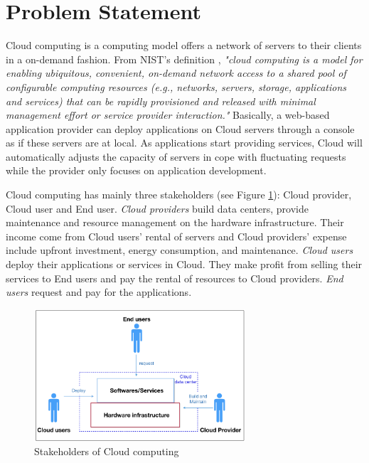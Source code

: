 \section{Problem Statement}

Cloud computing is a computing model offers a network of servers to their 
clients in a on-demand fashion. From NIST's definition \cite{Mell:2011jj}, \textit{"cloud computing is a model for enabling ubiquitous, convenient, on-demand network access to a shared pool of configurable computing resources (e.g., networks, servers, storage, applications and services) that can be rapidly provisioned and released with minimal management effort or service provider interaction."} 
Basically, a web-based application provider can deploy applications on Cloud servers through a console as if these servers are at local. As applications start providing services, Cloud will automatically adjusts the capacity of servers in cope with fluctuating requests while the provider only focuses on application development. 


Cloud computing has mainly three stakeholders \cite{Jennings:2015ht} (see Figure \ref{fig:stakeholders}): Cloud provider, Cloud user and End user. \emph{Cloud providers} build data centers, provide maintenance and resource management on the hardware infrastructure. Their income come from Cloud users' rental of servers and Cloud providers' expense include upfront investment, energy consumption, and maintenance. \emph{Cloud users} deploy their applications or services in Cloud. They make profit from selling their services to End users and pay the rental of resources to Cloud providers. \emph{End users} request and pay for the applications.
\begin{figure}[H]
	\centering
	\includegraphics[width=0.7\textwidth]{pics/stakeholders.png}
	\caption{Stakeholders of Cloud computing}
	\label{fig:stakeholders}
\end{figure}

